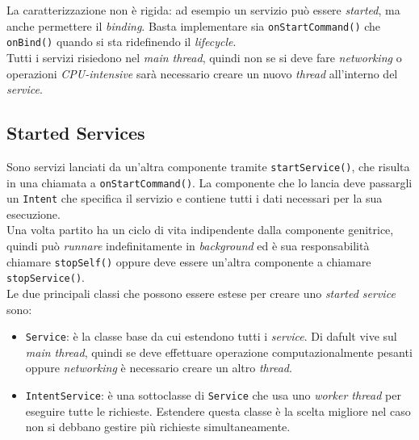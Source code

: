 La caratterizzazione non è rigida: ad esempio un servizio può essere \textit{started}, ma anche permettere il \textit{binding}. Basta implementare sia \texttt{onStartCommand()} che \texttt{onBind()} quando si sta ridefinendo il \textit{lifecycle}.\\
Tutti i servizi risiedono nel \textit{main thread}, quindi non se si deve fare \textit{networking} o operazioni \textit{CPU-intensive} sarà necessario creare un nuovo \textit{thread} all'interno del \textit{service}.


\subsection{Started Services}
Sono servizi lanciati da un'altra componente tramite \texttt{startService()}, che risulta in una chiamata a \texttt{onStartCommand()}. La componente che lo lancia deve passargli un \texttt{Intent} che specifica il servizio e contiene tutti i dati necessari per la sua esecuzione.\\
Una volta partito ha un ciclo di vita indipendente dalla componente genitrice, quindi può \textit{runnare} indefinitamente in \textit{background} ed è sua responsabilità chiamare \texttt{stopSelf()} oppure deve essere un'altra componente a chiamare \texttt{stopService()}.\\
Le due principali classi che possono essere estese per creare uno \textit{started service} sono:
\begin{itemize}
	\item \texttt{Service}: è la classe base da cui estendono tutti i \textit{service}. Di dafult vive sul \textit{main thread}, quindi se deve effettuare operazione computazionalmente pesanti oppure \textit{networking} è necessario creare un altro \textit{thread}.
	\item \texttt{IntentService}: è una sottoclasse di \texttt{Service} che usa uno \textit{worker thread} per eseguire tutte le richieste. Estendere questa classe è la scelta migliore nel caso non si debbano gestire più richieste simultaneamente.
\end{itemize}

